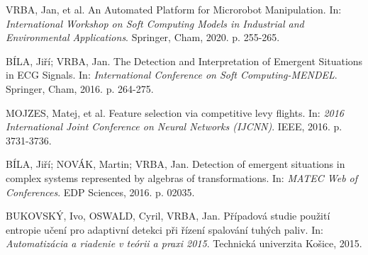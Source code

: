 \documentclass[11pt,twoside,openright]{report}
\begin{document}
\begin{enumerate}[label={[V\arabic*]}]
	\item \label{roboti}VRBA, Jan, et al. An Automated Platform for Microrobot Manipulation. In: \textit{International Workshop on Soft Computing Models in Industrial and Environmental Applications}. Springer, Cham, 2020. p. 255-265.
	\item \label{bila1}BÍLA, Jiří; VRBA, Jan. The Detection and Interpretation of Emergent Situations in ECG Signals. In: \textit{International Conference on Soft Computing-MENDEL}. Springer, Cham, 2016. p. 264-275.

	\item \label{ijcnn3}MOJZES, Matej, et al. Feature selection via competitive levy flights. In: \textit{2016 International Joint Conference on Neural Networks (IJCNN)}. IEEE, 2016. p. 3731-3736.
	
	\item \label{bila2}BÍLA, Jiří; NOVÁK, Martin; VRBA, Jan. Detection of emergent situations in complex systems represented by algebras of transformations. In: \textit{MATEC Web of Conferences}. EDP Sciences, 2016. p. 02035.	
	\item \label{artep2}BUKOVSKÝ, Ivo, OSWALD, Cyril, VRBA, Jan. Případová studie použití entropie učení pro adaptivní detekci při řízení spalování tuhých paliv. In: \textit{Automatizácia a riadenie v teórii a praxi 2015}. Technická univerzita Košice, 2015.
\end{enumerate}
\end{document}
